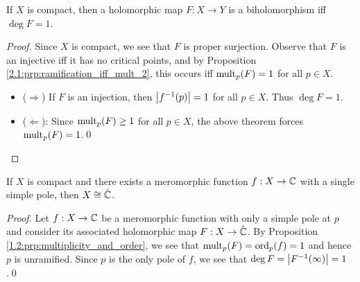 \documentclass[../Moduli_Spaces_of_Riemann_Surfaces.tex]{subfiles}
\begin{document}
    \begin{corollary}
        If $X$ is compact, then a holomorphic map $F:X\to Y$ is a biholomorphism iff $\deg F=1$.
    \end{corollary}
    \begin{proof}
        Since $X$ is compact, we see that $F$ is proper surjection. Observe that $F$ is an injective iff it has no critical points, and by Proposition \ref{2.1:prp:ramification_iff_mult_2}, this occurs iff $\operatorname{mult}_p\!\left(F\right)=1$ for all $p\in X$.
        \begin{itemize}
            \item ($\Rightarrow$) If $F$ is an injection, then $\left|f^{-1}\!\left(p\right)\right|=1$ for all $p\in X$. Thus $\deg F=1$.
            \item ($\Leftarrow$): Since $\operatorname{mult}_p\!\left(F\right)\geq1$ for all $p\in X$, the above theorem forces $\operatorname{mult}_p\!\left(F\right)=1$.\qed
        \end{itemize}
    \end{proof}
    \begin{corollary}
        If $X$ is compact and there exists a meromorphic function $f:X\to\mathbb{C}$ with a single simple pole, then $X\cong\hat{\mathbb{C}}$.
    \end{corollary}
    \begin{proof}
        Let $f:X\to\mathbb{C}$ be a meromorphic function with only a simple pole at $p$ and consider its associated holomorphic map $F:X\to\hat{\mathbb{C}}$. By Proposition \ref{1.2:prp:multiplicity_and_order}, we see that $\operatorname{mult}_p\!\left(F\right)=\operatorname{ord}_p\!\left(f\right)=1$ and hence $p$ is unramified. Since $p$ is the only pole of $f$, we see that $\deg F=\left|F^{-1}\!\left(\infty\right)\right|=1$.\qed
    \end{proof}
\end{document}
